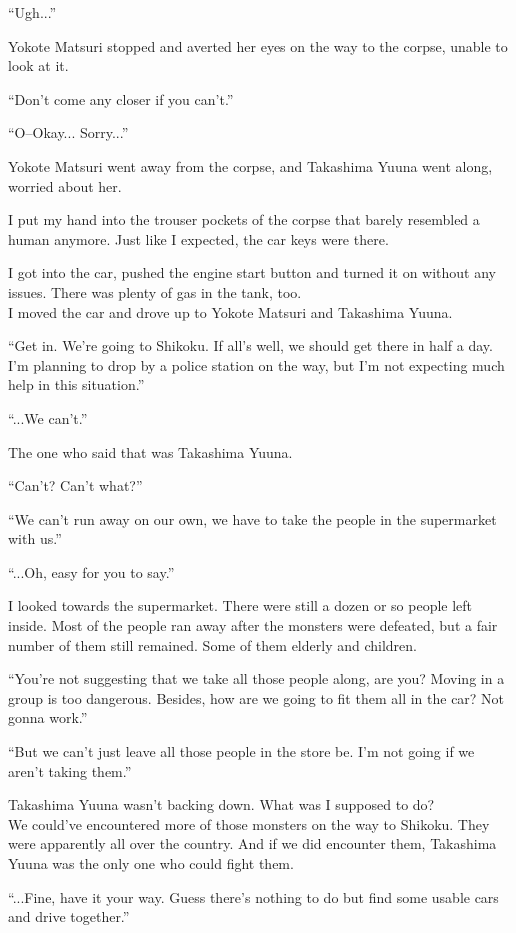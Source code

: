 ``Ugh...''

Yokote Matsuri stopped and averted her eyes on the way to the corpse, unable to look at it.

``Don't come any closer if you can't.''

``O--Okay... Sorry...''

Yokote Matsuri went away from the corpse, and Takashima Yuuna went along, worried about her.

I put my hand into the trouser pockets of the corpse that barely resembled a human anymore. Just like I expected, the car keys were there.

I got into the car, pushed the engine start button and turned it on without any issues. There was plenty of gas in the tank, too. \\
I moved the car and drove up to Yokote Matsuri and Takashima Yuuna.

``Get in. We're going to Shikoku. If all's well, we should get there in half a day. I'm planning to drop by a police station on the way, but I'm not expecting much help in this situation.''

``...We can't.''

The one who said that was Takashima Yuuna.

``Can't? Can't what?''

``We can't run away on our own, we have to take the people in the supermarket with us.''

``...Oh, easy for you to say.''

I looked towards the supermarket. There were still a dozen or so people left inside. Most of the people ran away after the monsters were defeated, but a fair number of them still remained. Some of them elderly and children.

``You're not suggesting that we take all those people along, are you? Moving in a group is too dangerous. Besides, how are we going to fit them all in the car? Not gonna work.''

``But we can't just leave all those people in the store be. I'm not going if we aren't taking them.''

Takashima Yuuna wasn't backing down. What was I supposed to do? \\
We could've encountered more of those monsters on the way to Shikoku. They were apparently all over the country. And if we did encounter them, Takashima Yuuna was the only one who could fight them.

``...Fine, have it your way. Guess there's nothing to do but find some usable cars and drive together.''

